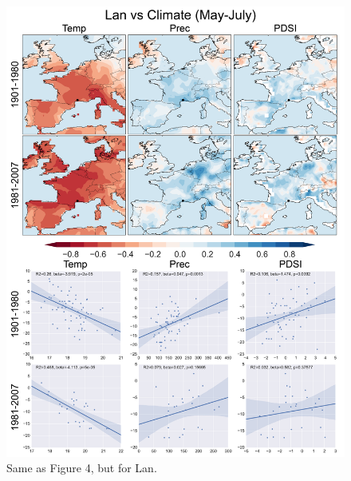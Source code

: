 \documentclass[12pt]{article}
\begin{document}
\begin{figure}
\center
\includegraphics[width=.9\columnwidth,scale=2]{SUPP_fig_08_Lan_MJJ_climate_onedeg_withtrend.png}
\caption{Same as Figure 4, but for Lan.}
\end{figure}
\end{document}
